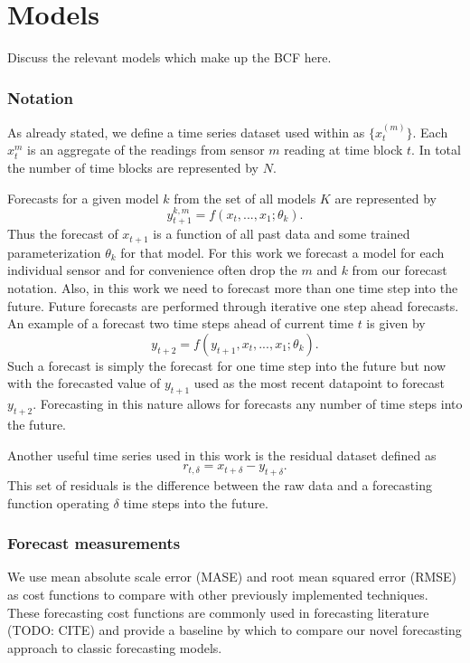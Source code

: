 \chapter{Models}
Discuss the relevant models which make up the BCF here.

\subsection{Notation}
As already stated, we define a time series dataset used within as  $\{x_{t}^{(m)}\}$.  Each $x_{t}^{m}$ is an aggregate of the readings from sensor $m$ reading at time block $t$.  In total the number of time blocks are represented by $N$.

Forecasts for a given model $k$ from the set of all models $K$ are represented by 
\begin{equation}
y_{t + 1}^{k, m} = f(x_{t}, ..., x_{1}; \theta_{k}).
\end{equation}
\noindent
Thus the forecast of $x_{t + 1}$ is a function of all past data and some trained parameterization $\theta_{k}$ for that model.  For this work we forecast a model for each individual sensor and for convenience often drop the $m$ and $k$ from our forecast notation.  Also, in this work we need to forecast more than one time step into the future.  Future forecasts are performed through iterative one step ahead forecasts.    An example of a forecast two time steps ahead of current time $t$ is given by 
\begin{equation}
y_{t + 2} = f(y_{t + 1}, x_{t}, ..., x_{1}; \theta_{k}).
\end{equation}
\noindent
Such a forecast is simply the forecast for one time step into the future but now with the forecasted value of $y_{t + 1}$ used as the most recent datapoint to forecast $y_{t + 2}$.  Forecasting in this nature allows for forecasts any number of time steps into the future.

Another useful time series used in this work is the residual dataset defined as
\begin{equation}
r_{t,\delta} =  x_{t + \delta} - y_{t + \delta}.
\end{equation}
This set of residuals is the difference between the raw data and a forecasting function operating $\delta$ time steps into the future. 


\subsection{Forecast measurements}
We use mean absolute scale error (MASE) \cite{Hyndman2006, Hyndman2006a} and root mean squared error (RMSE) as cost functions to compare with other previously implemented techniques.  These forecasting cost functions are commonly used in forecasting literature (TODO: CITE) and provide a baseline by which to compare our novel forecasting approach to classic forecasting models.  

